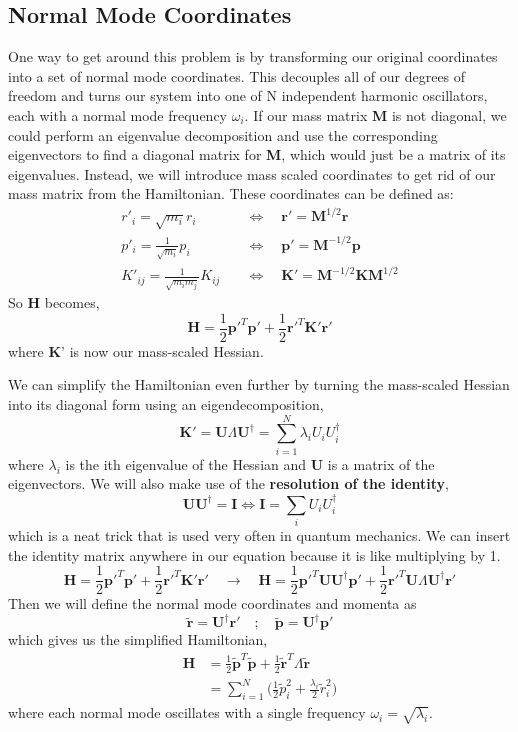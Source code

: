 \documentclass{article}
\newcommand{\be}{\begin{equation}}
\newcommand{\ee}{\end{equation}}
\newcommand{\br}{\textbf{r}}
\newcommand{\bp}{\textbf{p}}
\newcommand{\bm}{\textbf{M}}
\newcommand{\bk}{\textbf{K}}
\begin{document}
\subsection{Normal Mode Coordinates}
One way to get around this problem is by transforming our original coordinates into a set of normal mode coordinates.
This decouples all of our degrees of freedom and turns our system into one of N independent harmonic oscillators, each with a normal mode frequency $\omega_i$.
If our mass matrix \textbf{M} is not diagonal, we could perform an eigenvalue decomposition and use the corresponding eigenvectors to find a diagonal matrix for \bm, which would just be a matrix of its eigenvalues.
Instead, we will introduce mass scaled coordinates to get rid of our mass matrix from the Hamiltonian.
These coordinates can be defined as:
\be
  \begin{split}
    r'_i = \sqrt{m_i} r_i \quad &\Longleftrightarrow \quad \br' = \bm^{1/2} \br \\
    p'_i = \frac{1}{\sqrt{m_i}} p_i \quad &\Longleftrightarrow \quad \bp' = \bm^{-1/2} \bp \\
    K'_{i j} = \frac{1}{\sqrt{m_i m_j}} K_{i j} \quad &\Longleftrightarrow \quad \bk' = \bm^{-1/2} \bk \bm^{1/2}
  \end{split}
\ee
So \textbf{H} becomes,
\be
  \textbf{H} = \frac{1}{2} \bp'^T \bp' + \frac{1}{2} \br'^T \bk' \br'
\ee
where \bk' is now our mass-scaled Hessian.

We can simplify the Hamiltonian even further by turning the mass-scaled Hessian into its diagonal form using an eigendecomposition,
\be
  \bk' = \textbf{U} \Lambda \textbf{U}^{\dagger} = \sum_{i = 1}^N \lambda_i U_i U_i^{\dagger}
\ee
where $\lambda_i$ is the ith eigenvalue of the Hessian and \textbf{U} is a matrix of the eigenvectors.
We will also make use of the \textbf{resolution of the identity},
\be
  \textbf{U} \textbf{U}^{\dagger} = \textbf{I} \Longleftrightarrow \textbf{I} = \sum_i U_i U_i^{\dagger}
\ee
which is a neat trick that is used very often in quantum mechanics.
We can insert the identity matrix anywhere in our equation because it is like multiplying by 1.
\be
  \textbf{H} = \frac{1}{2} \bp'^T \bp' + \frac{1}{2} \br'^T \bk' \br' \quad \longrightarrow \quad \textbf{H} = \frac{1}{2} \bp'^T \textbf{U} \textbf{U}^{\dagger} \bp' + \frac{1}{2} \br'^T \textbf{U} \Lambda \textbf{U}^{\dagger} \br'
\ee
Then we will define the normal mode coordinates and momenta as
\be
  \tilde{\br} = \textbf{U}^{\dagger} \br' \quad ; \quad \tilde{\bp} = \textbf{U}^{\dagger} \bp'
\ee
which gives us the simplified Hamiltonian,
\be
  \begin{split}
    \textbf{H} &= \frac{1}{2} \tilde{\bp}^T \tilde{\bp} + \frac{1}{2} \tilde{\br}^T \Lambda \tilde{\br} \\
    &= \sum_{i=1}^{N} \Big( \frac{1}{2} \tilde{p}_i^2 + \frac{\lambda_i}{2} \tilde{r}_i^2 \Big)
  \end{split}
\ee
where each normal mode oscillates with a single frequency $\omega_i = \sqrt{\lambda_i}$.
\end{document}
